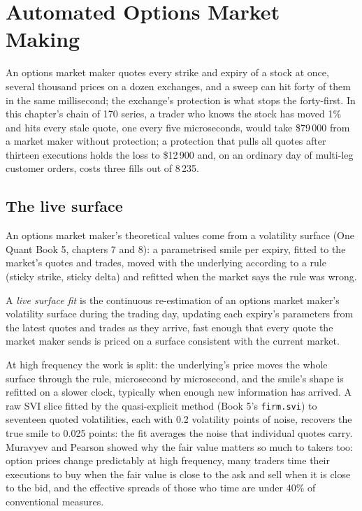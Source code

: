 \chapter{Automated Options Market Making}\label{ch:hf:automated-options-market-making}

An options market maker quotes every strike and expiry of a stock at once, several thousand prices on a dozen exchanges, and a sweep can hit forty
of them in the same millisecond; the exchange's protection is what stops the forty-first. In this chapter's chain of 170 series, a trader who
knows the stock has moved 1\% and hits every stale quote, one every five microseconds, would take \$79\,000 from a market maker without protection;
a protection that pulls all quotes after thirteen executions holds the loss to \$12\,900 and, on an ordinary day of multi-leg customer orders, costs
three fills out of 8\,235.

\section{The live surface}

An options market maker's theoretical values come from a volatility surface (One Quant Book 5, chapters 7 and 8): a parametrised smile per
expiry, fitted to the market's quotes and trades, moved with the underlying according to a rule (sticky strike, sticky delta) and refitted when
the market says the rule was wrong.

\begin{definition}\label{def:hf:automated-options-market-making:live}
A \emph{live surface fit} is the continuous re-estimation of an options market maker's volatility surface during the trading
day, updating each expiry's parameters from the latest quotes and trades as they arrive, fast enough that every quote the market maker sends is
priced on a surface consistent with the current market.
\end{definition}

At high frequency the work is split: the underlying's price moves the whole surface through the rule, microsecond by microsecond, and the smile's
shape is refitted on a slower clock, typically when enough new information has arrived. A raw SVI slice fitted by the quasi-explicit method
(Book 5's \texttt{firm.svi}) to seventeen quoted volatilities, each with 0.2 volatility points of noise, recovers the true smile to 0.025 points: the
fit averages the noise that individual quotes carry. Muravyev and Pearson showed why the fair value matters so much to takers too: option prices
change predictably at high frequency, many traders time their executions to buy when the fair value is close to the ask and sell when it is close to
the bid, and the effective spreads of those who time are under 40\% of conventional measures.

